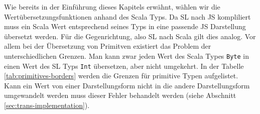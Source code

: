 \documentclass[12pt]{scrreprt}
\begin{document}


Wie bereits in der Einführung dieses Kapitels erwähnt, wählen wir die Wertübersetzungsfunktionen anhand des Scala Typs. Da \ac{SL} nach \ac{JS} kompliliert muss ein Scala Wert entsprechend seines Typs in eine passende \ac{JS} Darstellung übersetzt werden. Für die Gegenrichtung, also \ac{SL} nach Scala gilt dies analog. Vor allem bei der Übersetzung von Primitven existiert das Problem der unterschiedlichen Grenzen. Man kann zwar jeden Wert des Scala Types \lstinline!Byte! in einen Wert des \ac{SL} Typs \lstinline!Int! übersetzen, aber nicht umgekehrt. In der Tabelle \ref{tab:primitives-borders} werden die Grenzen für primitive Typen aufgelistet. Kann ein Wert von einer Darstellungsform nicht in die andere Darstellungsform umgewandelt werden muss dieser Fehler behandelt werden (siehe Abschnitt \ref{sec:trans-implementation}). 
\end{document}
